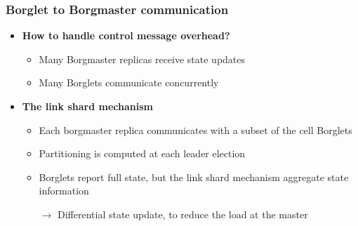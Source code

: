 \begin{frame}
\frametitle{Borglet to Borgmaster communication}
\begin{itemize}
	\item {\bf How to handle control message overhead?}
	\begin{itemize}
		\item Many Borgmaster replicas receive state updates
		\item Many Borglets communicate concurrently
	\end{itemize}

\vspace{20pt}

	\item {\bf The link shard mechanism}
	\begin{itemize}
		\item Each borgmaster replica communicates with a subset of the cell Borglets
		\item Partitioning is computed at each leader election
		\item Borglets report full state, but the link shard mechanism aggregate state information
		\item[$\to$] Differential state update, to reduce the load at the master
	\end{itemize}
\end{itemize}
\end{frame}

